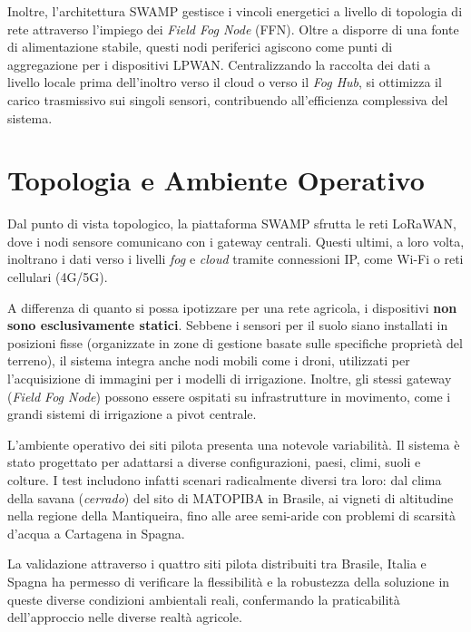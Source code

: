 Inoltre, l'architettura SWAMP gestisce i vincoli energetici a livello di topologia di rete attraverso l'impiego dei \textit{Field Fog Node} (FFN). %
Oltre a disporre di una fonte di alimentazione stabile, questi nodi periferici agiscono come punti di aggregazione per i dispositivi LPWAN. %
Centralizzando la raccolta dei dati a livello locale prima dell'inoltro verso il cloud o verso il \textit{Fog Hub}, si ottimizza il carico trasmissivo sui singoli sensori, contribuendo all'efficienza complessiva del sistema. %


\section{Topologia e Ambiente Operativo}

Dal punto di vista topologico, la piattaforma SWAMP sfrutta le reti LoRaWAN, dove i nodi sensore comunicano con i gateway centrali. %
Questi ultimi, a loro volta, inoltrano i dati verso i livelli \textit{fog} e \textit{cloud} tramite connessioni IP, come Wi-Fi o reti cellulari (4G/5G). %

A differenza di quanto si possa ipotizzare per una rete agricola, i dispositivi \textbf{non sono esclusivamente statici}. Sebbene i sensori per il suolo siano installati in posizioni fisse (organizzate in zone di gestione basate sulle specifiche proprietà del terreno), il sistema integra anche nodi mobili come i droni, utilizzati per l'acquisizione di immagini per i modelli di irrigazione. %
Inoltre, gli stessi gateway (\textit{Field Fog Node}) possono essere ospitati su infrastrutture in movimento, come i grandi sistemi di irrigazione a pivot centrale. %

L'ambiente operativo dei siti pilota presenta una notevole variabilità. Il sistema è stato progettato per adattarsi a diverse configurazioni, paesi, climi, suoli e colture. %
I test includono infatti scenari radicalmente diversi tra loro: dal clima della savana (\textit{cerrado}) del sito di MATOPIBA in Brasile, ai vigneti di altitudine nella regione della Mantiqueira, fino alle aree semi-aride con problemi di scarsità d'acqua a Cartagena in Spagna. %

La validazione attraverso i quattro siti pilota distribuiti tra Brasile, Italia e Spagna ha permesso di verificare la flessibilità e la robustezza della soluzione in queste diverse condizioni ambientali reali, confermando la praticabilità dell'approccio nelle diverse realtà agricole. %


